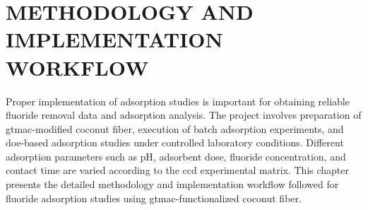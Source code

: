 \chapter{METHODOLOGY AND IMPLEMENTATION WORKFLOW}

Proper implementation of adsorption studies is important for obtaining reliable fluoride removal data and adsorption analysis. The project involves preparation of \gls{gtmac}-modified coconut fiber, execution of batch adsorption experiments, and \gls{doe}-based adsorption studies under controlled laboratory conditions. Different adsorption parameters such as pH, adsorbent dose, fluoride concentration, and contact time are varied according to the \gls{ccd} experimental matrix. This chapter presents the detailed methodology and implementation workflow followed for fluoride adsorption studies using \gls{gtmac}-functionalized coconut fiber. 
